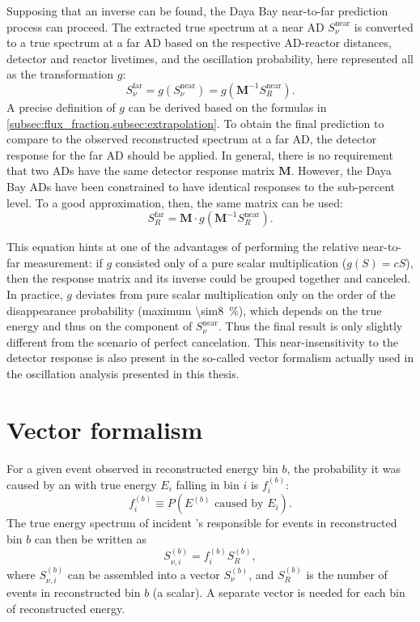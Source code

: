 Supposing that an inverse can be found,
the Daya Bay near-to-far prediction process can proceed.
The extracted true spectrum at a near AD $S_\nu^{\text{near}}$
is converted to a true spectrum at a far AD
based on the respective AD-reactor distances, detector and reactor livetimes,
and the oscillation probability, here represented all as
the transformation $g$:
\begin{equation}\label{eq:drm_trad_transform}
    S_\nu^{\text{far}} = g(S_\nu^{\text{near}}) = g(\mathbf{M}^{-1}S_R^{\text{near}}).
\end{equation}
A precise definition of $g$ can be derived based on the formulas in
\cref{subsec:flux_fraction,subsec:extrapolation}.
To obtain the final prediction to compare
to the observed reconstructed spectrum at a far AD,
the detector response for the far AD should be applied.
In general, there is no requirement that two ADs
have the same detector response matrix $\mathbf{M}$.
However, the Daya Bay ADs have been constrained to have
identical responses to the sub-percent level.
To a good approximation, then, the same matrix can be used:
\begin{equation}\label{eq:drm_trad_final}
    S_R^{\text{far}} = \mathbf{M} \cdot g(\mathbf{M}^{-1}S_R^{\text{near}}).
\end{equation}

This equation hints at one of the advantages of
performing the relative near-to-far measurement:
if $g$ consisted only of a pure scalar multiplication ($g(S) = cS$),
then the response matrix and its inverse could be grouped together
and canceled.
In practice, $g$ deviates from pure scalar multiplication
only on the order of the disappearance probability
(maximum \SI{\sim8}{\percent}),
which depends on the true \nuebar{} energy and thus on the component of
$S_\nu^{\text{near}}$.
Thus the final result is only slightly different from
the scenario of perfect cancelation.
This near-insensitivity to the detector response is also present
in the so-called vector formalism
actually used in the oscillation analysis presented in this thesis.

\section{Vector formalism}
\label{sec:drm_lbnl}

For a given event observed in reconstructed energy bin $b$,
the probability it was caused by an \nuebar{} with true energy $E_i$
falling in bin $i$ is $f_i^{(b)}$:
\begin{equation}\label{eq:drm_lbnl_prob}
    f_i^{(b)} \equiv P(E^{(b)} \text{ caused by } E_i).
\end{equation}
The true energy spectrum of incident \nuebar{}'s responsible for
events in reconstructed bin $b$ can then be written as
\begin{equation}\label{eq:drm_lbnl_spec}
    S_{\nu,i}^{(b)} = f_i^{(b)} S_R^{(b)},
\end{equation}
where $S_{\nu,i}^{(b)}$ can be assembled into a vector $S_\nu^{(b)}$,
and $S_R^{(b)}$ is the number of events in reconstructed bin $b$ (a scalar).
A separate vector is needed for each bin of reconstructed energy.

